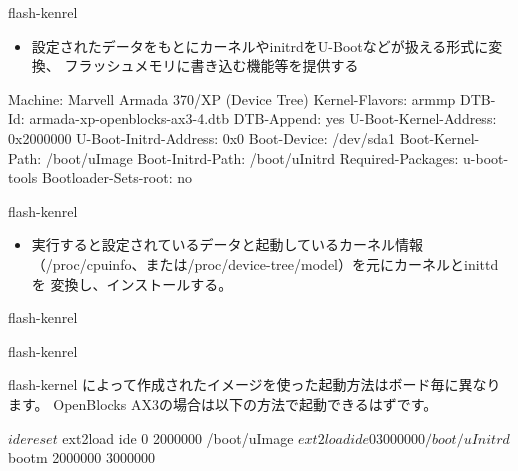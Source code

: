 \begin{frame}[containsverbatim]{flash-kenrel}

\begin{itemize}
\item 設定されたデータをもとにカーネルやinitrdをU-Bootなどが扱える形式に変換、
フラッシュメモリに書き込む機能等を提供する
\end{itemize}

\begin{commandline}
Machine: Marvell Armada 370/XP (Device Tree)
Kernel-Flavors: armmp
DTB-Id: armada-xp-openblocks-ax3-4.dtb
DTB-Append: yes
U-Boot-Kernel-Address: 0x2000000
U-Boot-Initrd-Address: 0x0
Boot-Device: /dev/sda1
Boot-Kernel-Path: /boot/uImage
Boot-Initrd-Path: /boot/uInitrd
Required-Packages: u-boot-tools
Bootloader-Sets-root: no
\end{commandline}

\end{frame}

\begin{frame}[containsverbatim]{flash-kenrel}

\begin{itemize}
\item 実行すると設定されているデータと起動しているカーネル情報
（/proc/cpuinfo、または/proc/device-tree/model）を元にカーネルとinittd を
変換し、インストールする。
\end{itemize}

\end{frame}

\begin{frame}[containsverbatim]{flash-kenrel}

\end{frame}

\begin{frame}[containsverbatim]{flash-kenrel}

flash-kernel によって作成されたイメージを使った起動方法はボード毎に異なります。
OpenBlocks AX3の場合は以下の方法で起動できるはずです。

\begin{commandline}
$ ide reset
$ ext2load ide 0 2000000 /boot/uImage
$ ext2load ide 0 3000000 /boot/uInitrd
$ bootm 2000000 3000000
\end{commandline}

\end{frame}

